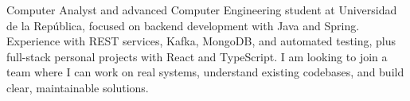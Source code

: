 \documentclass[letter,10pt]{article}
\begin{document}
Computer Analyst and advanced Computer Engineering student at Universidad de la República, focused on backend development with Java and Spring. Experience with REST services, Kafka, MongoDB, and automated testing, plus full-stack personal projects with React and TypeScript. I am looking to join a team where I can work on real systems, understand existing codebases, and build clear, maintainable solutions.
\end{document}
